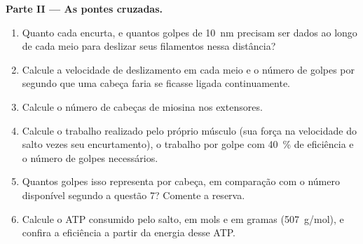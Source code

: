 \begin{problem}
\medskip
\noindent\textbf{Parte II --- As pontes cruzadas.}
\begin{enumerate}[resume]
  \item Quanto cada  encurta, e quantos golpes de \qty{10}{nm}
        precisam ser dados ao longo de cada meio  para deslizar
        seus filamentos nessa distância?
  \item Calcule a velocidade de deslizamento em cada meio  e o
        número de golpes por segundo que uma cabeça faria se ficasse
        ligada continuamente.
  \item Calcule o número de cabeças de miosina nos extensores.
  \item Calcule o trabalho realizado pelo próprio músculo (sua força na
        velocidade do salto vezes seu encurtamento), o trabalho por
        golpe com \qty{40}{\%} de eficiência e o número de golpes
        necessários.
  \item Quantos golpes isso representa por cabeça, em comparação com o
        número disponível segundo a questão 7? Comente a reserva.
  \item Calcule o ATP consumido pelo salto, em mols e em gramas
        (\qty{507}{g/mol}), e confira a eficiência a partir da energia
        desse ATP.
\end{enumerate}


\end{problem}
